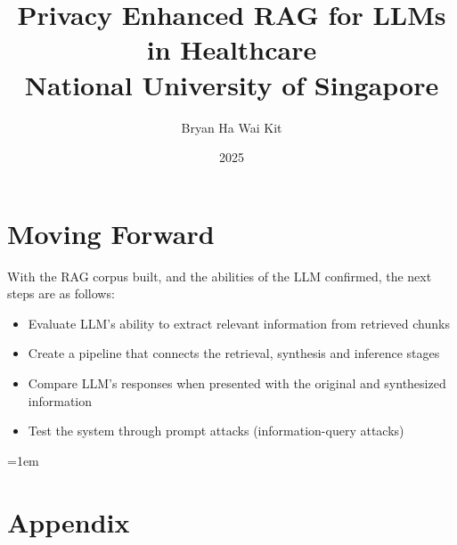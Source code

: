 \documentclass[12pt,twoside, draft]{report}
\title{
  {Privacy Enhanced RAG for LLMs in Healthcare}\\
  {\large National University of Singapore}\\
}
\author{Bryan Ha Wai Kit}
\date{2025}
\begin{document}
\maketitle


\tableofcontents
\listoffigures
\listoftables

\newpage
{}





\section{Moving Forward}

With the RAG corpus built, and the abilities of the LLM confirmed, the next steps are as follows:
\begin{itemize}
	\item Evaluate LLM's ability to extract relevant information from retrieved chunks
	\item Create a pipeline that connects the retrieval, synthesis and inference stages
	\item Compare LLM's responses when presented with the original and synthesized information
	\item Test the system through prompt attacks (information-query attacks)
\end{itemize}


\emergencystretch=1em
\printbibliography[title=References]
\nocite{*}
\break

\appendix
\section{Appendix}

\end{document}

